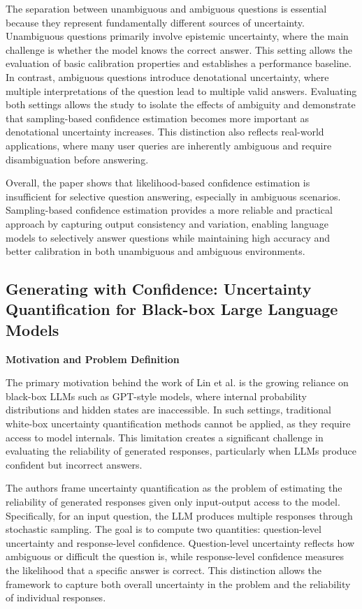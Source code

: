 The separation between unambiguous and ambiguous questions is essential because they represent fundamentally different sources of uncertainty. Unambiguous questions primarily involve epistemic uncertainty, where the main challenge is whether the model knows the correct answer. This setting allows the evaluation of basic calibration properties and establishes a performance baseline. In contrast, ambiguous questions introduce denotational uncertainty, where multiple interpretations of the question lead to multiple valid answers. Evaluating both settings allows the study to isolate the effects of ambiguity and demonstrate that sampling-based confidence estimation becomes more important as denotational uncertainty increases. This distinction also reflects real-world applications, where many user queries are inherently ambiguous and require disambiguation before answering.

Overall, the paper shows that likelihood-based confidence estimation is insufficient for selective question answering, especially in ambiguous scenarios. Sampling-based confidence estimation provides a more reliable and practical approach by capturing output consistency and variation, enabling language models to selectively answer questions while maintaining high accuracy and better calibration in both unambiguous and ambiguous environments.


\subsection{Generating with Confidence: Uncertainty Quantification for
Black-box Large Language Models
}

\textbf{Motivation and Problem Definition}

The primary motivation behind the work of Lin et al. is the growing reliance on black-box LLMs such as GPT-style models, where internal probability distributions and hidden states are inaccessible. In such settings, traditional white-box uncertainty quantification methods cannot be applied, as they require access to model internals. This limitation creates a significant challenge in evaluating the reliability of generated responses, particularly when LLMs produce confident but incorrect answers.

The authors frame uncertainty quantification as the problem of estimating the reliability of generated responses given only input-output access to the model. Specifically, for an input question, the LLM produces multiple responses through stochastic sampling. The goal is to compute two quantities: question-level uncertainty and response-level confidence. Question-level uncertainty reflects how ambiguous or difficult the question is, while response-level confidence measures the likelihood that a specific answer is correct. This distinction allows the framework to capture both overall uncertainty in the problem and the reliability of individual responses.

